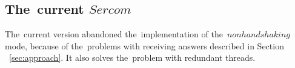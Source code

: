 %
%

\subsection*{The~current $Sercom$}\label{sec:current}
  The~current version abandoned the~implementation of the~$nonhandshaking$ mode, 
  because of the~problems with receiving answers described 
  in Section ~\ref{sec:approach}.
  It also solves the~problem with	redundant threads. 

